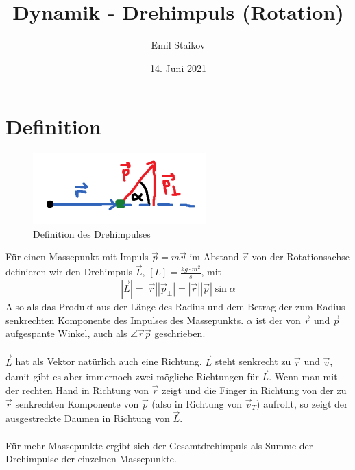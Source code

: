 \documentclass[11pt]{article}
\title{Dynamik - Drehimpuls (Rotation)}
\author{Emil Staikov}
\date{14. Juni 2021}
\begin{document}
\maketitle
\section{Definition}
\begin{figure}[H]
        \centering 
        \includegraphics{abb/7-rotation-drehimpuls/drehimpuls.png}
        \caption{Definition des Drehimpulses}
\end{figure}
Für einen Massepunkt mit Impuls $\vec{p} = m\vec{v}$ im Abstand $\vec{r}$ von der Rotationsachse definieren wir den Drehimpuls $\vec{L}$, $[L] = \frac{kg\cdot m^2}{s}$, mit 
\begin{equation*}
        |\vec{L}| = |\vec{r}||\vec{p}_\bot | = |\vec{r}||\vec{p}|\sin \alpha 
\end{equation*}
Also als das Produkt aus der Länge des Radius und dem Betrag der zum Radius senkrechten Komponente des Impulses des Massepunkts. $\alpha$ ist der von $\vec{r}$ und $\vec{p}$ aufgespante Winkel, auch als $\angle \vec{r} \vec{p}$ geschrieben. \\\\
$\vec{L}$ hat als Vektor natürlich auch eine Richtung. $\vec{L}$ steht senkrecht zu $\vec{r}$ und $\vec{v}$, damit gibt es aber immernoch zwei mögliche Richtungen für $\vec{L}$. Wenn man mit der rechten Hand in Richtung von $\vec{r}$ zeigt und die Finger in Richtung von der zu $\vec{r}$ senkrechten Komponente von $\vec{p}$ (also in Richtung von $\vec{v}_T$) aufrollt, so zeigt der ausgestreckte Daumen in Richtung von $\vec{L}$. \\\\
Für mehr Massepunkte ergibt sich der Gesamtdrehimpuls als Summe der Drehimpulse der einzelnen Massepunkte. 
\end{document}
